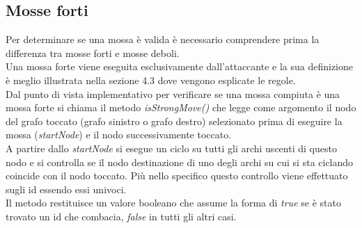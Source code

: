 \documentclass[a4paper,11pt,twoside,openright]{report}
\begin{document}
\subsection{Mosse forti}
Per determinare se una mossa è valida è necessario comprendere prima la differenza tra mosse forti e mosse deboli.\\
Una mossa forte viene eseguita esclusivamente dall'attaccante e la sua definizione è meglio illustrata nella sezione 4.3 dove vengono esplicate le regole.\\
Dal punto di vista implementativo per verificare se una mossa compiuta è una mossa forte si chiama il metodo \textit{isStrongMove()} che legge come argomento il nodo del grafo toccato (grafo sinistro o grafo destro) selezionato prima di eseguire la mossa (\textit{startNode}) e il nodo successivamente toccato.\\
A partire dallo \textit{startNode} si esegue un ciclo su tutti gli archi uscenti di questo nodo e si controlla se il nodo destinazione di uno degli archi su cui si sta ciclando coincide con il nodo toccato. Più nello specifico questo controllo viene effettuato sugli id essendo essi univoci.\\ 
Il metodo restituisce un valore booleano che assume la forma di \textit{true} se è stato trovato un id che combacia, \textit{false} in tutti gli altri casi.
\end{document}
